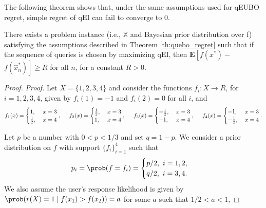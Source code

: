 \documentclass[
  letterpaper,
  DIV=11,
  numbers=noendperiod,
  oneside]{scrreprt}
\theoremstyle{remark}
\begin{document}
The following theorem shows that, under the same assumptions used for
qEUBO regret, simple regret of qEI can fail to converge to 0.

There exists a problem instance (i.e., \(\mathbb{X}\) and Bayesian prior
distribution over f) satisfying the assumptions described in Theorem
\hyperref[th:quebo_regret]{{[}th:quebo\_regret{]}} such that if the
sequence of queries is chosen by maximizing qEI, then
\(\mathbf{E}\left[f\left(x^*\right)-\right.\)
\(\left.f\left(\widehat{x}_n^*\right)\right] \geq R\) for all \(n\), for
a constant \(R>0\).

\begin{proof}
\emph{Proof.} Let \(X = \{1, 2, 3, 4\}\) and consider the functions
\(f_i:X \rightarrow R\), for \(i=1,2,3,4\), given by \(f_i(1) = -1\) and
\(f_i(2) = 0\) for all \(i\), and \[\begin{aligned}
    f_1(x) = \begin{cases}
    1, &\ x=3\\
    \frac{1}{2}, &\ x=4
    \end{cases},
\hspace{0.5cm}
f_2(x) = \begin{cases}
    \frac{1}{2}, &\ x=3\\
    1, &\ x=4
    \end{cases},
\hspace{0.5cm}
f_3(x) = \begin{cases}
    -\frac{1}{2}, &\ x=3\\
    -1, &\ x=4
    \end{cases},
\hspace{0.5cm}
f_4(x) = \begin{cases}
    -1, &\ x=3\\
    -\frac{1}{2}, &\ x=4
    \end{cases}.
\end{aligned}\]

Let \(p\) be a number with \(0 < p < 1/3\) and set \(q=1-p\). We
consider a prior distribution on \(f\) with support \(\{f_i\}_{i=1}^4\)
such that \[\begin{aligned}
 p_i = \prob(f=f_i) =   \begin{cases}
                        p/2, \  i =1,2,\\
                        q/2, \ i=3,4.
                        \end{cases}
\end{aligned}\] We also assume the user's response likelihood is given
by \(\prob(r(X)=1\mid f(x_1) > f(x_2)) = a\) for some \(a\) such that
\(1/2 < a < 1\),


\end{proof}
\end{document}
